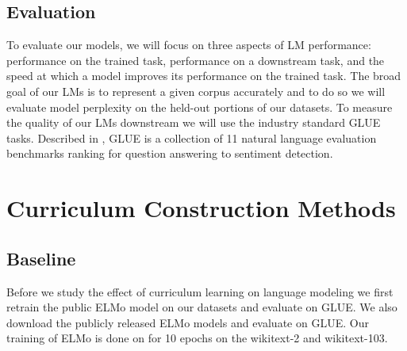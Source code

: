 \subsection{Evaluation}
To evaluate our models, we will focus on three aspects of LM performance: performance on the trained task, performance on a downstream task, and the speed at which a model improves its performance on the trained task. The broad goal of our LMs is to represent a given corpus accurately and to do so we will evaluate model perplexity on the held-out portions of our datasets.
To measure the quality of our LMs downstream we will use the industry standard GLUE tasks. Described in , GLUE \cite{Wang2018GLUEAM} is a collection of 11 natural language evaluation benchmarks ranking for question answering to sentiment detection. 
\section{Curriculum Construction Methods}
\label{chap:method:sec:cldevelopment}
\subsection{Baseline}
Before we study the effect of curriculum learning on language modeling we first retrain the public ELMo model on our datasets and evaluate on GLUE. We also download the publicly released ELMo models and evaluate on GLUE. Our training of ELMo is done on for 10 epochs on the wikitext-2 and wikitext-103.
